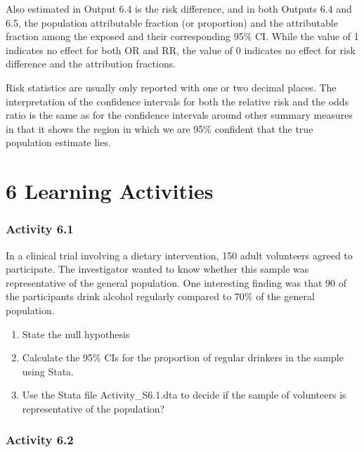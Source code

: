 \documentclass[
]{memoir}
\providecommand{\tightlist}{%
  \setlength{\itemsep}{0pt}\setlength{\parskip}{0pt}}
\begin{document}
Also estimated in Output 6.4 is the risk difference, and in both Outputs 6.4 and 6.5, the population attributable fraction (or proportion) and the attributable fraction among the exposed and their corresponding 95\% CI. While the value of 1 indicates no effect for both OR and RR, the value of 0 indicates no effect for risk difference and the attribution fractions.

Risk statistics are usually only reported with one or two decimal places. The interpretation of the confidence intervals for both the relative risk and the odds ratio is the same as for the confidence intervals around other summary measures in that it shows the region in which we are 95\% confident that the true population estimate lies.

\hypertarget{learning-activities-5}{%
\chapter*{\texorpdfstring{\textbf{6} Learning Activities}{6 Learning Activities}}\label{learning-activities-5}}

\hypertarget{activity-6.1}{%
\subsection*{Activity 6.1}\label{activity-6.1}}

In a clinical trial involving a dietary intervention, 150 adult volunteers agreed to participate. The investigator wanted to know whether this sample was representative of the general population. One interesting finding was that 90 of the participants drink alcohol regularly compared to 70\% of the general population.

\begin{enumerate}
\def\labelenumi{\alph{enumi})}
\tightlist
\item
  State the null hypothesis
\item
  Calculate the 95\% CIs for the proportion of regular drinkers in the sample using Stata.
\item
  Use the Stata file Activity\_S6.1.dta to decide if the sample of volunteers is representative of the population?
\end{enumerate}

\hypertarget{activity-6.2}{%
\subsection*{Activity 6.2}\label{activity-6.2}}
\end{document}
